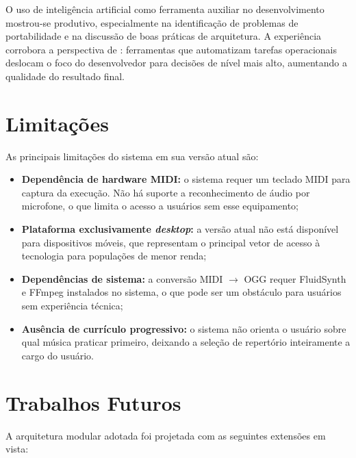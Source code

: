 \documentclass[
  12pt,
  openright,
  twoside,
  a4paper,
  english,
  brazil
]{abntex2}
\begin{document}
O uso de inteligência artificial como ferramenta auxiliar no
desenvolvimento mostrou-se produtivo, especialmente na identificação de
problemas de portabilidade e na discussão de boas práticas de
arquitetura. A experiência corrobora a perspectiva de
\textcite{kapp2012}: ferramentas que automatizam tarefas operacionais
deslocam o foco do desenvolvedor para decisões de nível mais alto,
aumentando a qualidade do resultado final.

\section{Limitações}

As principais limitações do sistema em sua versão atual são:

\begin{itemize}
  \item \textbf{Dependência de hardware MIDI:} o sistema requer um
        teclado MIDI para captura da execução. Não há suporte a
        reconhecimento de áudio por microfone, o que limita o acesso
        a usuários sem esse equipamento;
  \item \textbf{Plataforma exclusivamente \textit{desktop}:} a versão
        atual não está disponível para dispositivos móveis, que
        representam o principal vetor de acesso à tecnologia para
        populações de menor renda;
  \item \textbf{Dependências de sistema:} a conversão MIDI $\to$ OGG
        requer FluidSynth e FFmpeg instalados no sistema, o que
        pode ser um obstáculo para usuários sem experiência técnica;
  \item \textbf{Ausência de currículo progressivo:} o sistema não
        orienta o usuário sobre qual música praticar primeiro,
        deixando a seleção de repertório inteiramente a cargo do
        usuário.
\end{itemize}

\section{Trabalhos Futuros}
\label{sec:trabalhos-futuros}

A arquitetura modular adotada foi projetada com as seguintes extensões
em vista:
\end{document}
